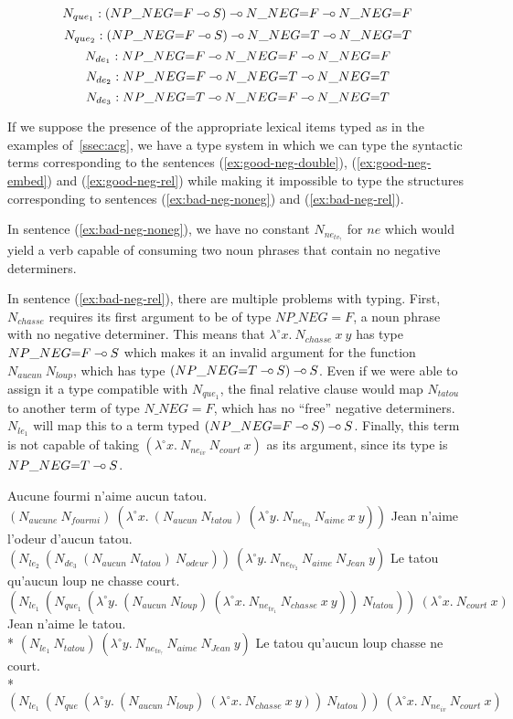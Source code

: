 $$
N_{que_1} : (NP\_NEG{=}F \mathbin{{-}\mkern-3.5mu{\circ}} S) \mathbin{{-}\mkern-3.5mu{\circ}} N\_NEG{=}F \mathbin{{-}\mkern-3.5mu{\circ}} N\_NEG{=}F
$$
$$
N_{que_2} : (NP\_NEG{=}F \mathbin{{-}\mkern-3.5mu{\circ}} S) \mathbin{{-}\mkern-3.5mu{\circ}} N\_NEG{=}T \mathbin{{-}\mkern-3.5mu{\circ}} N\_NEG{=}T
$$
$$
N_{de_1} : NP\_NEG{=}F \mathbin{{-}\mkern-3.5mu{\circ}} N\_NEG{=}F \mathbin{{-}\mkern-3.5mu{\circ}} N\_NEG{=}F
$$
$$
N_{de_2} : NP\_NEG{=}F \mathbin{{-}\mkern-3.5mu{\circ}} N\_NEG{=}T \mathbin{{-}\mkern-3.5mu{\circ}} N\_NEG{=}T
$$
$$
N_{de_3} : NP\_NEG{=}T \mathbin{{-}\mkern-3.5mu{\circ}} N\_NEG{=}F \mathbin{{-}\mkern-3.5mu{\circ}} N\_NEG{=}T
$$

If we suppose the presence of the appropriate lexical items typed as in
the examples of~\ref{ssec:acg}, we have a type system in which we can
type the syntactic terms corresponding to the sentences
(\ref{ex:good-neg-double}), (\ref{ex:good-neg-embed}) and
(\ref{ex:good-neg-rel}) while making it impossible to type the
structures corresponding to sentences (\ref{ex:bad-neg-noneg}) and
({\ref{ex:bad-neg-rel}}).

In sentence (\ref{ex:bad-neg-noneg}), we have no constant
$N_{ne_{tv_?}}$ for $ne$ which would yield a verb capable of consuming
two noun phrases that contain no negative determiners.

In sentence (\ref{ex:bad-neg-rel}), there are multiple problems with
typing. First, $N_{chasse}$ requires its first argument to be of type
$NP\_NEG{=}F$, a noun phrase with no negative determiner. This means
that $\lambda^{\circ} x.\ N_{chasse}\ x\ y$ has type $NP\_NEG{=}F \mathbin{{-}\mkern-3.5mu{\circ}}
S$ which makes it an invalid argument for the function
$N_{aucun}\ N_{loup}$, which has type $(NP\_NEG{=}T \mathbin{{-}\mkern-3.5mu{\circ}} S) \mathbin{{-}\mkern-3.5mu{\circ}}
S$. Even if we were able to assign it a type compatible with
$N_{que_1}$, the final relative clause would map $N_{tatou}$ to another
term of type $N\_NEG{=}F$, which has no ``free'' negative
determiners. $N_{le_1}$ will map this to a term typed $(NP\_NEG{=}F
\mathbin{{-}\mkern-3.5mu{\circ}} S) \mathbin{{-}\mkern-3.5mu{\circ}} S$. Finally, this term is not capable of taking
$(\lambda^{\circ} x.\ N_{ne_{iv}}\ N_{court}\ x)$ as its argument, since
its type is $NP\_NEG{=}T \mathbin{{-}\mkern-3.5mu{\circ}} S$.

\begin{exe}
  \ex \label{ex:good-neg-double} Aucune fourmi n'aime aucun tatou. \\
      $(N_{aucune}\ N_{fourmi})\ (\lambda^{\circ} x.\ (N_{aucun}\ N_{tatou})\ (\lambda^{\circ} y.\ N_{ne_{tv_3}}\ N_{aime}\ x\ y))$
  \ex \label{ex:good-neg-embed} Jean n'aime l'odeur d'aucun tatou. \\
      $(N_{le_2}\ (N_{de_3}\ (N_{aucun}\ N_{tatou})\ N_{odeur}))\ (\lambda^{\circ} y.\ N_{ne_{tv_2}}\ N_{aime}\ N_{Jean}\ y)$
  \ex \label{ex:good-neg-rel} Le tatou qu'aucun loup ne chasse court. \\
      $(N_{le_1}\ (N_{que_1}\ (\lambda^{\circ} y.\ (N_{aucun}\ N_{loup})\ (\lambda^{\circ} x.\ N_{ne_{tv_1}}\ N_{chasse}\ x\ y))\ N_{tatou}))\ (\lambda^{\circ} x.\ N_{court}\ x)$
  \ex * \label{ex:bad-neg-noneg} Jean n'aime le tatou. \\
      * $(N_{le_1}\ N_{tatou})\ (\lambda^{\circ} y.\ N_{ne_{tv_?}}\ N_{aime}\ N_{Jean}\ y)$
  \ex * \label{ex:bad-neg-rel} Le tatou qu'aucun loup chasse ne court. \\
      * $(N_{le_1}\ (N_{que}\ (\lambda^{\circ} y.\ (N_{aucun}\ N_{loup})\ (\lambda^{\circ} x.\ N_{chasse}\ x\ y))\ N_{tatou}))\ (\lambda^{\circ} x.\ N_{ne_{iv}}\ N_{court}\ x)$
\end{exe}

